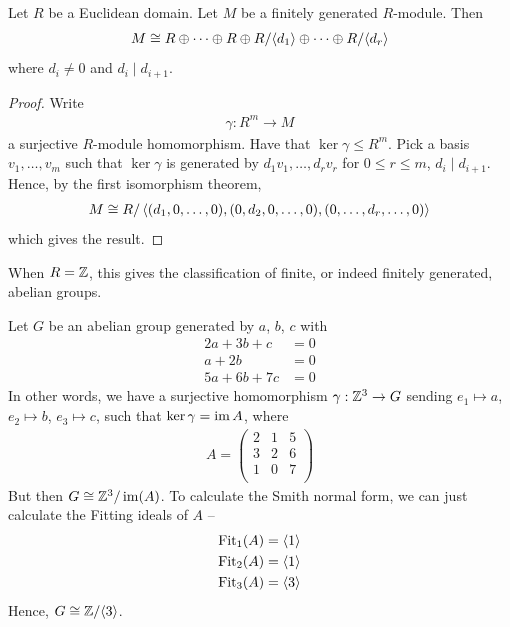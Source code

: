 \documentclass{../../template/note}
\begin{document}
    \begin{theorem}
        Let $R$ be a Euclidean domain. Let $M$ be a finitely generated $R$-module. Then
        \begin{align*}
            M \cong R \oplus \dots \oplus R \oplus R/\!\left \langle d_1 \right \rangle \oplus \dots \oplus R/\!\left \langle d_r \right \rangle
        \end{align*}
        where $d_i \neq 0$ and $d_i \mid d_{i+1}$.
    \end{theorem}
    
    \begin{proof}
        Write
        \begin{align*}
            \gamma: R^m \to M
        \end{align*}
        a surjective $R$-module homomorphism. Have that $\ker \gamma \leq R^m$. Pick a basis $v_1, \dots, v_m$ such that $\ker \gamma$ is generated by $d_1v_1, \dots, d_rv_r$ for $0 \leq r \leq m$, $d_i \mid d_{i+1}$. Hence, by the first isomorphism theorem,
        \begin{align*}
            M \cong R/\left \langle (d_1, 0, \dots, 0), (0, d_2, 0, \dots, 0), (0, \dots, d_r, \dots, 0) \right \rangle
        \end{align*}
        which gives the result.
    \end{proof}
    
    When $R = \mathbb Z$, this gives the classification of finite, or indeed finitely generated, abelian groups.

    \begin{example*}
        Let $G$ be an abelian group generated by $a$, $b$, $c$ with
        \begin{align*}
            2a+3b+c&=0 \\
            a+2b&=0 \\
            5a+6b+7c&=0
        \end{align*}
        In other words, we have a surjective homomorphism $\gamma: \mathbb Z^3 \to G$ sending $e_1 \mapsto a$, $e_2 \mapsto b$, $e_3 \mapsto c$, such that $\ker \gamma = \operatorname{im} A$, where
        \begin{align*}
            A = \begin{pmatrix}
                2 & 1 & 5 \\
                3 & 2 & 6 \\
                1 & 0 & 7 \\
            \end{pmatrix}
        \end{align*}
        But then $G \cong \mathbb Z^3/\operatorname{im}(A)$. To calculate the Smith normal form, we can just calculate the Fitting ideals of $A$ --
        \begin{align*}
            \operatorname{Fit}_1(A) &= \left \langle 1 \right \rangle \\
            \operatorname{Fit}_2(A) &= \left \langle 1 \right \rangle \\
            \operatorname{Fit}_3(A) &= \left \langle 3 \right \rangle
        \end{align*}
        Hence, $G \cong \mathbb Z/\!\left \langle 3 \right \rangle$.        
    \end{example*}
    
\end{document}
